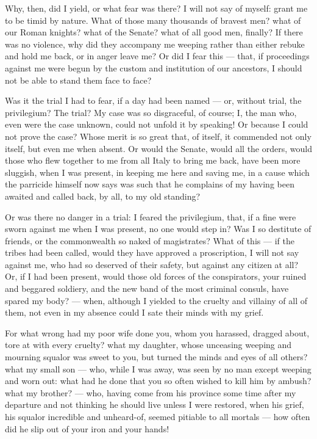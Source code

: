  Why, then, did I yield, or what fear was there? I will not say of myself: grant me to be timid by nature. What of those many thousands of bravest men? what of our Roman knights? what of the Senate? what of all good men, finally? If there was no violence, why did they accompany me weeping rather than either rebuke and hold me back, or in anger leave me? Or did I fear this --- that, if proceedings against me were begun by the custom and institution of our ancestors, I should not be able to stand them face to face?

 Was it the trial I had to fear, if a day had been named --- or, without trial, the privilegium? The trial? My case was so disgraceful, of course; I, the man who, even were the case unknown, could not unfold it by speaking! Or because I could not prove the case? Whose merit is so great that, of itself, it commended not only itself, but even me when absent. Or would the Senate, would all the orders, would those who flew together to me from all Italy to bring me back, have been more sluggish, when I was present, in keeping me here and saving me, in a cause which the parricide himself now says was such that he complains of my having been awaited and called back, by all, to my old standing?

 Or was there no danger in a trial: I feared the privilegium, that, if a fine were sworn against me when I was present, no one would step in? Was I so destitute of friends, or the commonwealth so naked of magistrates? What of this --- if the tribes had been called, would they have approved a proscription, I will not say against me, who had so deserved of their safety, but against any citizen at all? Or, if I had been present, would those old forces of the conspirators, your ruined and beggared soldiery, and the new band of the most criminal consuls, have spared my body? --- when, although I yielded to the cruelty and villainy of all of them, not even in my absence could I sate their minds with my grief.

 For what wrong had my poor wife done you, whom you harassed, dragged about, tore at with every cruelty? what my daughter, whose unceasing weeping and mourning squalor was sweet to you, but turned the minds and eyes of all others? what my small son --- who, while I was away, was seen by no man except weeping and worn out: what had he done that you so often wished to kill him by ambush? what my brother? --- who, having come from his province some time after my departure and not thinking he should live unless I were restored, when his grief, his squalor incredible and unheard-of, seemed pitiable to all mortals --- how often did he slip out of your iron and your hands!

